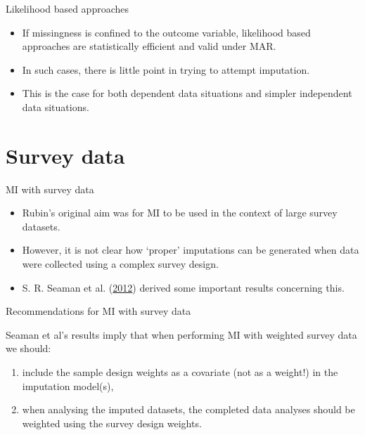 \documentclass[ignorenonframetext,]{beamer}
\providecommand{\tightlist}{%
  \setlength{\itemsep}{0pt}\setlength{\parskip}{0pt}}
\begin{document}
\begin{frame}{Likelihood based approaches}
\protect\hypertarget{likelihood-based-approaches}{}

\begin{itemize}
\tightlist
\item
  If missingness is confined to the outcome variable, likelihood based
  approaches are statistically efficient and valid under MAR.
\item
  In such cases, there is little point in trying to attempt imputation.
\item
  This is the case for both dependent data situations and simpler
  independent data situations.
\end{itemize}

\end{frame}

\hypertarget{survey-data}{%
\section{Survey data}\label{survey-data}}

\begin{frame}{MI with survey data}
\protect\hypertarget{mi-with-survey-data}{}

\begin{itemize}
\tightlist
\item
  Rubin's original aim was for MI to be used in the context of large
  survey datasets.
\item
  However, it is not clear how `proper' imputations can be generated
  when data were collected using a complex survey design.
\item
  S. R. Seaman et al. (\protect\hyperlink{ref-Seaman2012a}{2012})
  derived some important results concerning this.
\end{itemize}

\end{frame}

\begin{frame}{Recommendations for MI with survey data}
\protect\hypertarget{recommendations-for-mi-with-survey-data}{}

Seaman et al's results imply that when performing MI with weighted
survey data we should:

\begin{enumerate}
\tightlist
\item
  include the sample design weights as a covariate (not as a weight!) in
  the imputation model(s),
\item
  when analysing the imputed datasets, the completed data analyses
  should be weighted using the survey design weights.
\end{enumerate}

\end{frame}
\end{document}
